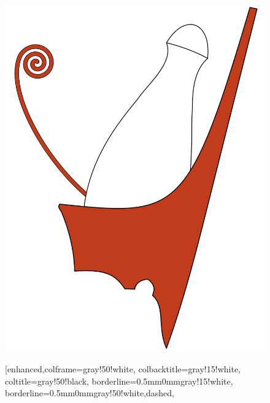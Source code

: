 \begin{figure}[H]
	\centering
	\begin{minipage}{0.45\textwidth}
		\begin{tcolorbox}[enhanced,colframe=gray!50!white,
			colbacktitle=gray!15!white,
			coltitle=gray!50!black,
			borderline={0.5mm}{0mm}{gray!15!white},
			borderline={0.5mm}{0mm}{gray!50!white,dashed},
			attach boxed title to top center={yshift=-2mm},
			boxed title style={boxrule=0.4pt},
			title=Kettős korona]{
				\includegraphics[width=1.0\linewidth]{images/01/kettos_korona}}
		\end{tcolorbox}
	\end{minipage}
	\hfill
	\begin{minipage}{0.45\textwidth}
		\begin{tcolorbox}[enhanced,colframe=gray!50!white,
			colbacktitle=gray!15!white,
			coltitle=gray!50!black,
			borderline={0.5mm}{0mm}{gray!15!white},
			borderline={0.5mm}{0mm}{gray!50!white,dashed},

\end{tcolorbox}
\end{minipage}
\end{figure}
